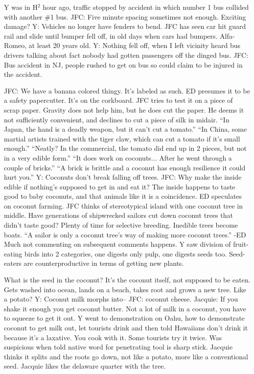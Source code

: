 \documentclass[10pt]{article}
\begin{document}
Y was in H$^2$ hour ago, traffic stopped by accident in which number 1
bus collided with another \#1 bus.  JFC: Five minute spacing sometimes
not enough.  Exciting damage?  Y: Vehicles no longer have fenders to
bend.  JFC has seen car hit guard rail and slide until bumper fell
off, in old days when cars had bumpers.  Alfa-Romeo, at least 20 years
old.  Y: Nothing fell off, when I left vicinity heard bus drivers
talking about fact nobody had gotten passengers off the dinged bus.
JFC: Bus accident in NJ, people rushed to get on bus so could claim to
be injured in the accident. 

JFC: We have a banana colored thingy.  It's labeled as such.  ED
presumes it to be a safety papercutter.  It's on the corkboard.  JFC
tries to test it on a piece of scrap paper.  Gravity does not help
him, but he does cut the paper.  He deems it not sufficiently
convenient, and declines to cut a piece of silk in midair.  ``In Japan,
the hand is a deadly weapon, but it can't cut a tomato.''  ``In China,
some martial artists trained with the tiger claw, which can cut a
tomato if it's small enough.''  ``Neatly?  In the commercial, the tomato
did end up in 2 pieces, but not in a very edible form.''  ``It does work
on coconuts...  After he went through a couple of bricks.''  ``A brick
is brittle and a coconut has enough resilience it could hurt you.''  Y:
Coconuts don't break falling off trees.  JFC: Why make the inside
edible if nothing's supposed to get in and eat it?  The inside happens
to taste good to baby coconuts, and that animals like it is a
coincidence.  ED speculates on coconut farming.  JFC thinks of
stereotypical island with one coconut tree in middle.  Have
generations of shipwrecked sailors cut down coconut trees that didn't
taste good?  Plenty of time for selective breeding.  Inedible trees
become boats.  ``A sailor is only a coconut tree's way of making more
coconut trees.'' -ED Much not commenting on subsequent comments
happens.  Y saw division of fruit-eating birds into 2 categories, one
digests only pulp, one digests seeds too.  Seed-eaters are
counterproductive in terms of getting new plants.

What is the seed in the coconut?  It's the coconut itself, not
supposed to be eaten.  Gets washed into ocean, lands on a beach, takes
root and grows a new tree.  Like a potato?  Y: Coconut milk morphs
into-- JFC:  coconut cheese.  Jacquie: If you shake it enough you get coconut
butter.  Not a lot of milk in a coconut, you have to squeeze to get it
out.  Y went to demonstration on Oahu, how to demonstrate coconut to
get milk out, let tourists drink and then told Hawaiians don't drink
it because it's a laxative.  You cook with it.  Some tourists try it
twice.  Was suspicious when told native word for penetrating tool is
sharp stick.  Jacquie thinks it splits and the roots go down, not like
a potato, more like a conventional seed.  Jacquie likes the delaware
quarter with the tree.  
\end{document}
